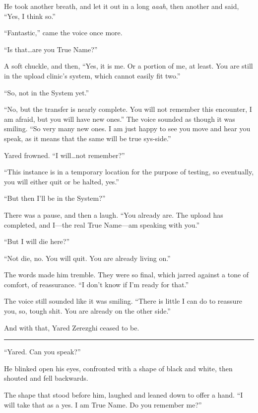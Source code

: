 He took another breath, and let it out in a long \emph{aaah}, then another and said, ``Yes, I think so.''

``Fantastic,'' came the voice once more.

``Is that\ldots are you True Name?''

A soft chuckle, and then, ``Yes, it is me. Or a portion of me, at least. You are still in the upload clinic's system, which cannot easily fit two.''

``So, not in the System yet.''

``No, but the transfer is nearly complete. You will not remember this encounter, I am afraid, but you will have new ones.'' The voice sounded as though it was smiling. ``So very many new ones. I am just happy to see you move and hear you speak, as it means that the same will be true sys-side.''

Yared frowned. ``I will\ldots{}not remember?''

``This instance is in a temporary location for the purpose of testing, so eventually, you will either quit or be halted, yes.''

``But then I'll be in the System?''

There was a pause, and then a laugh. ``You already are. The upload has completed, and I---the real True Name---am speaking with you.''

``But I will die here?''

``Not die, no. You will quit. You are already living on.''

The words made him tremble. They were so final, which jarred against a tone of comfort, of reassurance. ``I don't know if I'm ready for that.''

The voice still sounded like it was smiling. ``There is little I can do to reassure you, so, tough shit. You are already on the other side.''

And with that, Yared Zerezghi ceased to be.

\begin{center}\rule{0.5\linewidth}{0.5pt}\end{center}

``Yared. Can you speak?''

He blinked open his eyes, confronted with a shape of black and white, then shouted and fell backwards.

The shape that stood before him, laughed and leaned down to offer a hand. ``I will take that as a yes. I am True Name. Do you remember me?''


